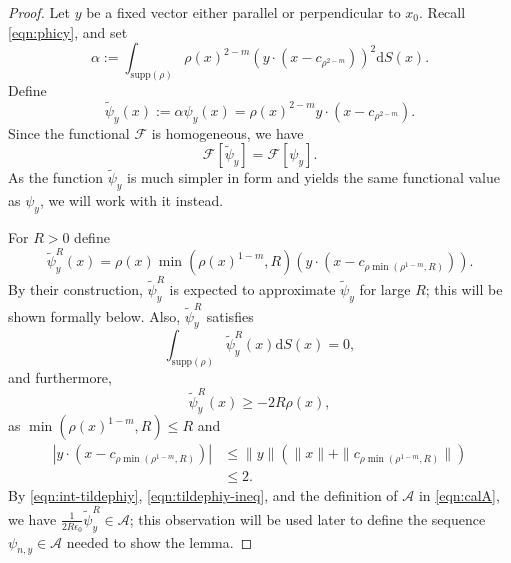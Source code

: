 \documentclass[11pt]{amsart}
\newcommand{\calA}{\mathcal{A}}
\newcommand{\calF}{\mathcal{F}}
\newcommand{\dx}{\mathrm{d}S (x)}
\newcommand{\supp}{\mathrm{supp}(\rho)}
\begin{document}
\begin{proof}
Let $y$ be a fixed vector either parallel or perpendicular to $x_0$. Recall \eqref{eqn:phicy}, and set
\[
\alpha:=\int_{\supp}\rho(x)^{2-m}\left(y\cdot (x-c_{\rho^{2-m}})\right)^2\dx.
\]
Define 
\[
\tilde{\psi}_y(x):=\alpha\psi_y(x)=\rho(x)^{2-m}y\cdot(x-c_{\rho^{2-m}}).
\]
Since the functional $\calF$ is homogeneous, we have
\begin{equation}
\label{eqn:Ftildephi=Fphi}
\mathcal{F}[\tilde{\psi}_y]=\mathcal{F}[\psi_y].
\end{equation}
As the function $\tilde{\psi}_y$ is much simpler in form and yields the same functional value as $\psi_y$, we will work with it instead.

For $R>0$ define
\[
\tilde{\psi}_y^R(x)=\rho(x)\min(\rho(x)^{1-m}, R)\left(y\cdot\left(x-c_{\rho\min(\rho^{1-m}, R)}\right)\right).
\]
By their construction, $\tilde{\psi}_y^R$ is expected to approximate $\tilde{\psi}_y$ for large $R$; this will be shown formally below. Also, $\tilde{\psi}_y^R$ satisfies
\begin{equation}
\label{eqn:int-tildephiy}
\int_{\supp}\tilde{\psi}_y^R(x)\dx=0,
\end{equation}
and furthermore,
\begin{equation}
\label{eqn:tildephiy-ineq}
\tilde{\psi}_y^R(x)\geq -2R\rho(x),
\end{equation}
as $\min(\rho(x)^{1-m},R)\leq R$ and 
\begin{align*}
\left|y\cdot\left(x-c_{\rho \min(\rho^{1-m}, R)}\right)\right| &\leq \|y\| \left( \|x\| + \| c_{\rho \min(\rho^{1-m}, R)}\| \right) \\[2pt]
&\leq 2.
\end{align*}
By \eqref{eqn:int-tildephiy}, \eqref{eqn:tildephiy-ineq}, and the definition of $\calA$ in \eqref{eqn:calA}, we have $\frac{1}{2R\epsilon_0}\tilde{\psi}_y^R\in\mathcal{A}$; this observation will be used later to define the sequence $\psi_{n,y} \in \calA$ needed to show the lemma.


\end{proof}
\end{document}
